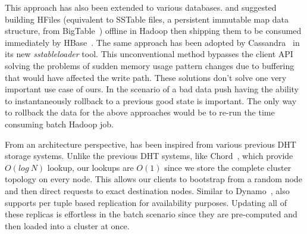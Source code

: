 This approach has also been extended to various databases. \citet{konstantinou}
and \citet{barbuzzi} suggested building HFiles (equivalent to SSTable files, a
persistent immutable map data structure, from BigTable~\cite{bigtable}) offline
in Hadoop then shipping them to be consumed immediately by HBase~\cite{hbase}.
The same approach has been adopted by Cassandra~\cite{cassandra} in its new
\emph{sstableloader} tool. This unconventional method bypasses the client API 
solving the problems of sudden memory usage pattern changes due to buffering 
that would have affected the write path. These solutions don't solve one very 
important use case of ours. In the scenario of a bad data push having the ability 
to instantaneously rollback to a previous good state is important. The only 
way to rollback the data for the above approaches would be to re-run the time 
consuming batch Hadoop job.

From an architecture perspective, \projectname{} has been inspired from various
previous DHT storage systems. Unlike the previous DHT systems, like
Chord~\cite{chord}, which provide $O(log~N)$ lookup, our lookups are $O(1)$
since we store the complete cluster topology on every node. This allows our
clients to bootstrap from a random node and then direct requests to exact
destination nodes. Similar to Dynamo~\cite{dynamo}, \projectname{} also
supports per tuple based replication for availability purposes. Updating all of
these replicas is effortless in the batch scenario since they are pre-computed
and then loaded into a \projectname{} cluster at once. 

